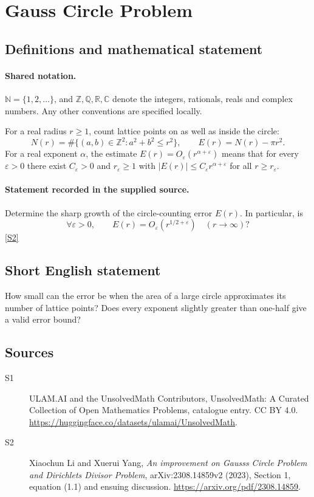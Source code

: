 \documentclass[11pt]{article}
\newcommand{\sref}[2]{\hyperlink{source:#1:#2}{[S#2]}}
\begin{document}
\section{Gauss Circle Problem}\label{statement}

\subsection{Definitions and mathematical statement}

\paragraph{Shared notation.}$\mathbb N=\{1,2,\ldots\}$, and $\mathbb Z,\mathbb Q,\mathbb R,\mathbb C$ denote the integers, rationals, reals and complex numbers. Any other conventions are specified locally.


For a real radius $r\geq1$, count lattice points on as well as inside the circle:
\[
N(r)=\#\{(a,b)\in\mathbb Z^2:a^2+b^2\leq r^2\},\qquad E(r)=N(r)-\pi r^2.
\]
For a real exponent $\alpha$, the estimate $E(r)=O_{\varepsilon}(r^{\alpha+\varepsilon})$ means that for every $\varepsilon>0$ there exist $C_\varepsilon>0$ and $r_\varepsilon\geq1$ with $|E(r)|\leq C_\varepsilon r^{\alpha+\varepsilon}$ for all $r\geq r_\varepsilon$.
\paragraph{Statement recorded in the supplied source.}
Determine the sharp growth of the circle-counting error $E(r)$. In particular, is
\[
\forall\varepsilon>0,\qquad E(r)=O_\varepsilon(r^{1/2+\varepsilon})\quad(r\to\infty)?
\] \sref{statement}{2}

\subsection{Short English statement}
How small can the error be when the area of a large circle approximates its number of lattice points? Does every exponent slightly greater than one-half give a valid error bound?
\subsection{Sources}
\begin{description}
\item[\hypertarget{source:statement:1}{S1}] ULAM.AI and the UnsolvedMath Contributors, UnsolvedMath: A Curated Collection of Open Mathematics Problems, catalogue entry. CC BY 4.0. \url{https://huggingface.co/datasets/ulamai/UnsolvedMath}.
\item[\hypertarget{source:statement:2}{S2}] Xiaochun Li and Xuerui Yang, \emph{An improvement on Gauss\textquotesingle s Circle Problem and Dirichlet\textquotesingle s Divisor Problem}, arXiv:2308.14859v2 (2023), Section 1, equation (1.1) and ensuing discussion. \url{https://arxiv.org/pdf/2308.14859}.
\end{description}
\label{end:statement}
\end{document}
